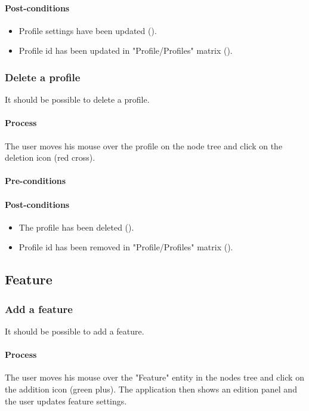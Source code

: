 \documentclass[11pt,a4paper,oneside]{article}
\begin{document}
\paragraph{Post-conditions}
\begin{itemize}
	\item Profile settings have been updated ().
	\item Profile id has been updated in "Profile/Profiles" matrix ().
\end{itemize}

\subsubsection{Delete a profile}
It should be possible to delete a profile.

\paragraph{Process}
The user moves his mouse over the profile on the node tree and click on the deletion icon (red cross).

\paragraph{Pre-conditions}

\paragraph{Post-conditions}
\begin{itemize}
	\item The profile has been deleted ().
	\item Profile id has been removed in "Profile/Profiles" matrix ().
\end{itemize}

\subsection{Feature}

\subsubsection{Add a feature}
It should be possible to add a feature.

\paragraph{Process}
The user moves his mouse over the "Feature" entity in the nodes tree and click on the addition icon (green plus). The application then shows an edition panel and the user updates feature settings.
\end{document}
